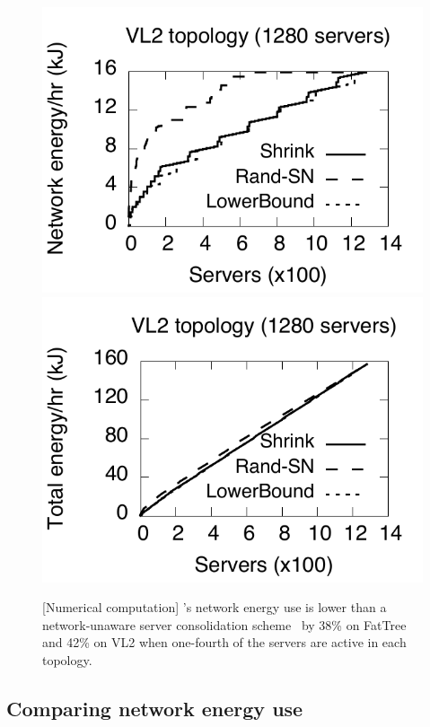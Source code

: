 \begin{figure}[t]
                        \centering\includegraphics[scale=0.4]{graphs/final/vl2.pdf}
                \includegraphics[scale=0.4]{graphs/final/vl2-total.pdf}
\caption{[Numerical computation] \shrink's network energy use is lower than a network-unaware server consolidation scheme \randSN\ by 38\% on FatTree and 42\% on VL2 when one-fourth of the servers are active in each topology.}
\label{fig:fattree}
\end{figure}

\subsection{Comparing network energy use}
\label{sec:net-compare}


